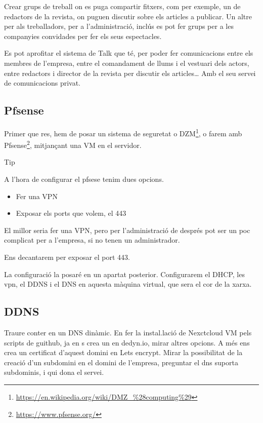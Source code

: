 \documentclass[
  10pt,
]{krantz}
\DeclareRobustCommand{\href}[2]{#2\footnote{\url{#1}}}
\providecommand{\tightlist}{%
  \setlength{\itemsep}{0pt}\setlength{\parskip}{0pt}}
\begin{document}
Crear grups de treball on es puga compartir fitxers, com per exemple, un de redactors de la revista, on puguen discutir sobre els articles a publicar. Un altre per als treballadors, per a l'administració, inclús es pot fer grups per a les companyies convidades per fer els seus espectacles.

Es pot aprofitar el sistema de Talk que té, per poder fer comunicacions entre els membres de l'empresa, entre el comandament de llums i el vestuari dels actors, entre redactors i director de la revista per discutir els articles\ldots{} Amb el seu servei de comunicacions privat.

\hypertarget{pfsense-1}{%
\subsection{Pfsense}\label{pfsense-1}}

Primer que res, hem de posar un sistema de seguretat o \href{https://en.wikipedia.org/wiki/DMZ_\%28computing\%29}{DZM}, o farem amb \href{https://www.pfsense.org/}{Pfsense}, mitjançant una VM en el servidor.

\begin{rmdtip}{Tip}

A l'hora de configurar el pfsese tenim dues opcions.

\begin{itemize}
\tightlist
\item
  Fer una VPN
\item
  Exposar els ports que volem, el 443
\end{itemize}

\end{rmdtip}

El millor seria fer una VPN, pero per l'administració de després pot ser un poc complicat per a l'empresa, si no tenen un administrador.

Ens decantarem per exposar el port 443.

La configuració la posaré en un apartat posterior. Configurarem el DHCP, les vpn, el DDNS i el DNS en aquesta màquina virtual, que sera el cor de la xarxa.

\hypertarget{ddns}{%
\subsection{DDNS}\label{ddns}}

Traure conter en un DNS dinàmic. En fer la instal.lació de Nexctcloud VM pels scripts de guithub, ja en s crea un en dedyn.io, mirar altres opcions. A més ens crea un certificat d'aquest domini en Lets encrypt. Mirar la possibilitat de la creació d'un subdomini en el domini de l'empresa, preguntar el dns suporta subdominis, i qui dona el servei.
\end{document}
